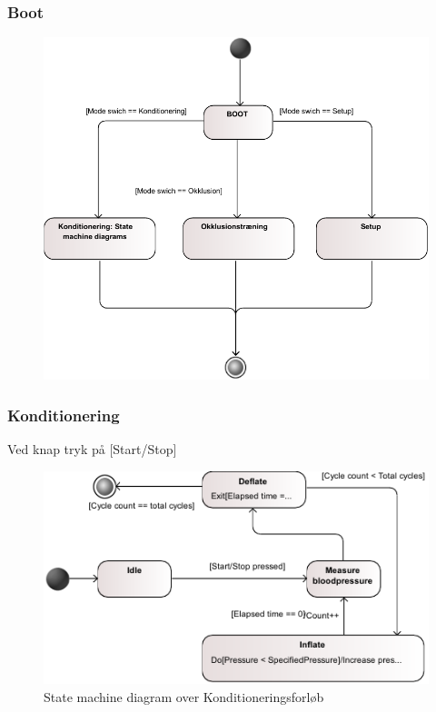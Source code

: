 \subsubsection{Boot}
\begin{figure}[H]
\includegraphics[width=\textwidth]{pdfs/STM_BOOT-crop.pdf} 
\caption{}
\end{figure}

\newpage
\subsubsection{Konditionering}
Ved knap tryk på [Start/Stop] \\
\begin{figure}[H]
\includegraphics[width=\textwidth]{pdfs/STM_Konditionering1-crop.pdf}
\caption{State machine diagram over Konditioneringsforløb}
\end{figure}

